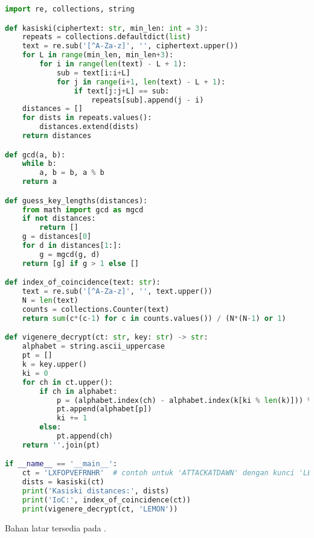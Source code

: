 \documentclass[../main.tex]{subfiles}
\begin{document}
\begin{lstlisting}[language=Python, caption={Vigenère: Kasiski dan IoC}, label={lst:vigenere}]
import re, collections, string

def kasiski(ciphertext: str, min_len: int = 3):
    repeats = collections.defaultdict(list)
    text = re.sub('[^A-Za-z]', '', ciphertext.upper())
    for L in range(min_len, min_len+3):
        for i in range(len(text) - L + 1):
            sub = text[i:i+L]
            for j in range(i+1, len(text) - L + 1):
                if text[j:j+L] == sub:
                    repeats[sub].append(j - i)
    distances = []
    for dists in repeats.values():
        distances.extend(dists)
    return distances

def gcd(a, b):
    while b:
        a, b = b, a % b
    return a

def guess_key_lengths(distances):
    from math import gcd as mgcd
    if not distances:
        return []
    g = distances[0]
    for d in distances[1:]:
        g = mgcd(g, d)
    return [g] if g > 1 else []

def index_of_coincidence(text: str):
    text = re.sub('[^A-Za-z]', '', text.upper())
    N = len(text)
    counts = collections.Counter(text)
    return sum(c*(c-1) for c in counts.values()) / (N*(N-1) or 1)

def vigenere_decrypt(ct: str, key: str) -> str:
    alphabet = string.ascii_uppercase
    pt = []
    k = key.upper()
    ki = 0
    for ch in ct.upper():
        if ch in alphabet:
            p = (alphabet.index(ch) - alphabet.index(k[ki % len(k)])) % 26
            pt.append(alphabet[p])
            ki += 1
        else:
            pt.append(ch)
    return ''.join(pt)

if __name__ == '__main__':
    ct = 'LXFOPVEFRNHR'  # contoh untuk 'ATTACKATDAWN' dengan kunci 'LEMON'
    dists = kasiski(ct)
    print('Kasiski distances:', dists)
    print('IoC:', index_of_coincidence(ct))
    print(vigenere_decrypt(ct, 'LEMON'))
\end{lstlisting}

\noindent Bahan latar tersedia pada \textcite{kasiski-examination,friedman1922ioc,crypto101}.
\end{document}
